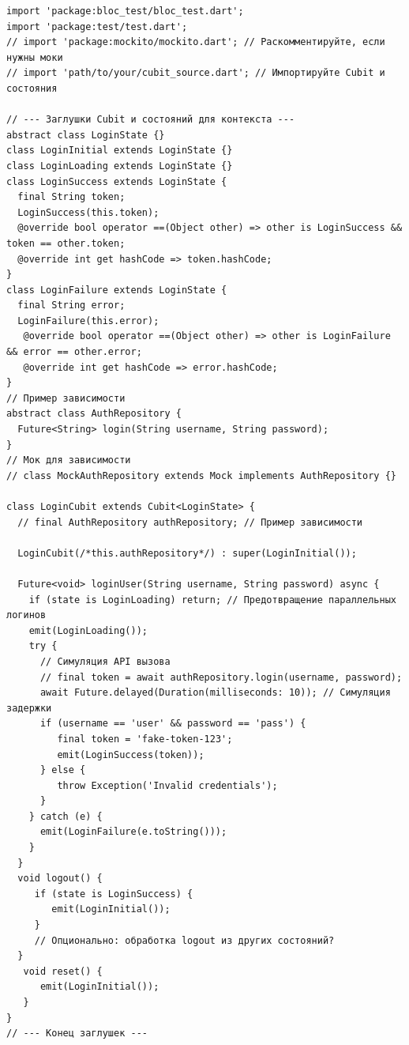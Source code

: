 \documentclass[14pt, russian]{scrartcl}
\begin{document}
\begin{listing}[!htb]
\caption{Пример сгенерированного теста для Cubit (Dart, bloc\_test)}
\label{lst:cubit_test_example}
\begin{verbatim}
import 'package:bloc_test/bloc_test.dart';
import 'package:test/test.dart';
// import 'package:mockito/mockito.dart'; // Раскомментируйте, если нужны моки
// import 'path/to/your/cubit_source.dart'; // Импортируйте Cubit и состояния

// --- Заглушки Cubit и состояний для контекста ---
abstract class LoginState {}
class LoginInitial extends LoginState {}
class LoginLoading extends LoginState {}
class LoginSuccess extends LoginState {
  final String token;
  LoginSuccess(this.token);
  @override bool operator ==(Object other) => other is LoginSuccess && token == other.token;
  @override int get hashCode => token.hashCode;
}
class LoginFailure extends LoginState {
  final String error;
  LoginFailure(this.error);
   @override bool operator ==(Object other) => other is LoginFailure && error == other.error;
   @override int get hashCode => error.hashCode;
}
// Пример зависимости
abstract class AuthRepository {
  Future<String> login(String username, String password);
}
// Мок для зависимости
// class MockAuthRepository extends Mock implements AuthRepository {}

class LoginCubit extends Cubit<LoginState> {
  // final AuthRepository authRepository; // Пример зависимости

  LoginCubit(/*this.authRepository*/) : super(LoginInitial());

  Future<void> loginUser(String username, String password) async {
    if (state is LoginLoading) return; // Предотвращение параллельных логинов
    emit(LoginLoading());
    try {
      // Симуляция API вызова
      // final token = await authRepository.login(username, password);
      await Future.delayed(Duration(milliseconds: 10)); // Симуляция задержки
      if (username == 'user' && password == 'pass') {
         final token = 'fake-token-123';
         emit(LoginSuccess(token));
      } else {
         throw Exception('Invalid credentials');
      }
    } catch (e) {
      emit(LoginFailure(e.toString()));
    }
  }
  void logout() {
     if (state is LoginSuccess) {
        emit(LoginInitial());
     }
     // Опционально: обработка logout из других состояний?
  }
   void reset() {
      emit(LoginInitial());
   }
}
// --- Конец заглушек ---
\end{verbatim}
\end{listing}
\end{document}
